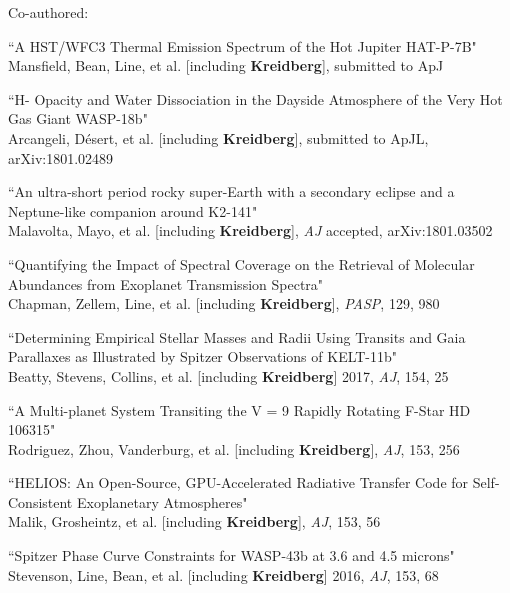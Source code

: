 \documentclass[12pt,letterpaper]{article}
\begin{document}
\vspace{3mm}
\hspace*{5mm}Co-authored:
\begin{compactenum}
\item ``A HST/WFC3 Thermal Emission Spectrum of the Hot Jupiter HAT-P-7B"\\
Mansfield, Bean, Line, et al. [including \textbf{Kreidberg}], submitted to ApJ

\item ``H- Opacity and Water Dissociation in the Dayside Atmosphere of the Very Hot Gas Giant WASP-18b"\\
Arcangeli, D\'{e}sert, et al. [including \textbf{Kreidberg}], submitted to ApJL, arXiv:1801.02489

\item ``An ultra-short period rocky super-Earth with a secondary eclipse and a Neptune-like companion around K2-141"\\
Malavolta, Mayo, et al. [including \textbf{Kreidberg}], \textit{AJ} accepted, arXiv:1801.03502

\item ``Quantifying the Impact of Spectral Coverage on the Retrieval of Molecular Abundances from Exoplanet Transmission Spectra"\\
Chapman, Zellem, Line, et al. [including \textbf{Kreidberg}], \textit{PASP}, 129, 980

\item ``Determining Empirical Stellar Masses and Radii Using Transits and Gaia Parallaxes as Illustrated by Spitzer Observations of KELT-11b"\\
Beatty, Stevens, Collins, et al. [including \textbf{Kreidberg}] 2017, \textit{AJ}, 154, 25 

\item ``A Multi-planet System Transiting the V = 9 Rapidly Rotating F-Star HD 106315"\\
Rodriguez, Zhou, Vanderburg, et al. [including \textbf{Kreidberg}], \textit{AJ}, 153, 256

\item ``HELIOS: An Open-Source, GPU-Accelerated Radiative Transfer Code for Self-Consistent Exoplanetary Atmospheres"\\
Malik, Grosheintz,  et al. [including \textbf{Kreidberg}], \textit{AJ}, 153, 56 

\item ``Spitzer Phase Curve Constraints for WASP-43b at 3.6 and 4.5 microns"\\
Stevenson, Line, Bean, et al. [including \textbf{Kreidberg}] 2016, \textit{AJ}, 153, 68 


\end{compactenum}
\end{document}
